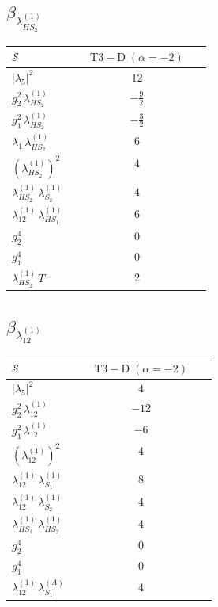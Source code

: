 \documentclass[9pt]{article}
\begin{document}
\subsection*{$ \beta_{\lambda_{HS_2}^{(1)}} $}
\begin{longtable}{@{}p{0.31\linewidth}c@{}}
\toprule
$\mathcal{S}$ & $ \mathrm{T3-D}\;(\alpha=-2) $ \\
\midrule
$ |\lambda_5|^2 $ & $ 12 $ \\
$ g_2^2\,\lambda_{HS_2}^{(1)} $ & $ - \frac{9}{2} $ \\
$ g_1^2\,\lambda_{HS_2}^{(1)} $ & $ - \frac{3}{2} $ \\
$ \lambda_1\,\lambda_{HS_2}^{(1)} $ & $ 6 $ \\
$ \left(\lambda_{HS_2}^{(1)}\right)^2 $ & $ 4 $ \\
$ \lambda_{HS_2}^{(1)}\,\lambda_{S_2}^{(1)} $ & $ 4 $ \\
$ \lambda_{12}^{(1)}\,\lambda_{HS_1}^{(1)} $ & $ 6 $ \\
$ g_2^4 $ & $ 0 $ \\
$ g_1^4 $ & $ 0 $ \\
$ \lambda_{HS_2}^{(1)}\,T $ & $ 2 $ \\
\bottomrule
\end{longtable}
\subsection*{$ \beta_{\lambda_{12}^{(1)}} $}
\begin{longtable}{@{}p{0.31\linewidth}c@{}}
\toprule
$\mathcal{S}$ & $ \mathrm{T3-D}\;(\alpha=-2) $ \\
\midrule
$ |\lambda_5|^2 $ & $ 4 $ \\
$ g_2^2\,\lambda_{12}^{(1)} $ & $ -12 $ \\
$ g_1^2\,\lambda_{12}^{(1)} $ & $ -6 $ \\
$ \left(\lambda_{12}^{(1)}\right)^2 $ & $ 4 $ \\
$ \lambda_{12}^{(1)}\,\lambda_{S_1}^{(1)} $ & $ 8 $ \\
$ \lambda_{12}^{(1)}\,\lambda_{S_2}^{(1)} $ & $ 4 $ \\
$ \lambda_{HS_1}^{(1)}\,\lambda_{HS_2}^{(1)} $ & $ 4 $ \\
$ g_2^4 $ & $ 0 $ \\
$ g_1^4 $ & $ 0 $ \\
$ \lambda_{12}^{(1)}\,\lambda_{S_1}^{(A)} $ & $ 4 $ \\
\bottomrule
\end{longtable}
\end{document}
